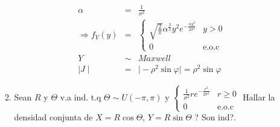 \begin{enumerate}
\begin{enumerate}
\begin{eqnarray*}
 \alpha &=& \frac{1}{\sigma^2}\\
 \Rightarrow f_{Y} \left(y \right)&=& \begin{cases} 
 \sqrt{ \frac{2}{\pi} } \alpha^{ \frac{3}{2}} y^2 e^{- \frac{\alpha y^2}{ 2\sigma^2} } & y>0\\
0 & \textrm{e.o.c}
 \end{cases}\\
 Y &\sim & Maxwell\\
 \mid J  \mid &=& \mid - \rho^2 \sin \varphi \mid = \rho^2 \sin \varphi
\end{eqnarray*}
 \item  Sean $R$ y $\Theta$ v.a ind. t.q $\Theta \sim U \left( -\pi , \pi \right)$ y
 $ \begin{cases} 
 \frac{1}{\sigma^2}r e^{- \frac{r^2}{2\sigma^2} } & r\geq 0\\
 0 & \textrm{e.o.c}
 \end{cases} 
 $
 Hallar la densidad conjunta de $X = R \cos \Theta$, $Y=R \sin \Theta$ ? Son ind?.
 

\end{enumerate}
\end{enumerate}
